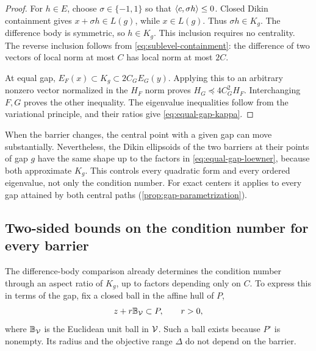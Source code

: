 \begin{proof}
For $h\in E$, choose $\sigma\in\{-1,1\}$ so that
$\left\langle c,\sigma h\right\rangle\leq0$. Closed Dikin containment gives
$x+\sigma h\in L(g)$, while $x\in L(g)$. Thus $\sigma h\in K_g$.
The difference body is symmetric, so $h\in K_g$. This inclusion requires
no centrality. The reverse inclusion follows from
\eqref{eq:sublevel-containment}: the difference of two vectors of local
norm at most $C$ has local norm at most $2C$.

At equal gap, $E_F(x)\subset K_g\subset2C_G E_G(y)$. Applying this
to an arbitrary nonzero vector normalized in the $H_F$ norm proves
$H_G\preceq4C_G^2H_F$. Interchanging $F,G$ proves the other inequality.
The eigenvalue inequalities follow from the variational principle, and
their ratios give \eqref{eq:equal-gap-kappa}.
\end{proof}

When the barrier changes, the central point with a given gap can move
substantially. Nevertheless, the Dikin ellipsoids of the two barriers
at their points of gap $g$ have the same shape up to the factors in \eqref{eq:equal-gap-loewner}, because both
approximate $K_g$. This controls every quadratic form and every ordered
eigenvalue, not only the condition number. For exact centers it applies
to every gap attained by both central paths
(\cref{prop:gap-parametrization}).

\subsection{Two-sided bounds on the condition number for every barrier}

The difference-body comparison already determines the condition number
through an aspect ratio of $K_g$, up to factors depending only on $C$.
To express this in terms of the gap, fix a closed ball in
the affine hull of $P$,
\begin{equation}
 z+r\mathbb B_{\mathcal V}\subset P,\qquad r>0,
 \label{eq:interior-ball}
\end{equation}
where $\mathbb B_{\mathcal V}$ is the Euclidean unit ball in $\mathcal V$. Such a ball exists because
$P^\circ$ is nonempty. Its radius and the objective range $\Delta$
do not depend on the barrier.

